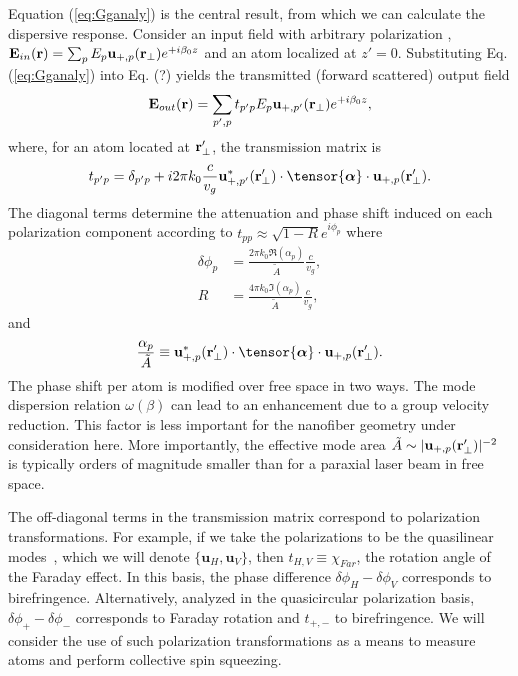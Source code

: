\documentclass[preprint,aps,pra,onecolumn]{revtex4-1} %
\begin{document}
Equation (\ref{eq:Gganaly}) is the central result, from which we can calculate the dispersive response.  
Consider an input field with arbitrary polarization , $\mathbf{E}_{in}(\mathbf{r}) = \sum_p E_p 
\mathbf{u}_{+,p}(\mathbf{r}_\perp) e^{+i \beta_0 z}$ and an atom localized at $z'=0$.  Substituting Eq. 
(\ref{eq:Gganaly}) into Eq. (?) yields the transmitted (forward scattered) output field 
\begin{equation}
\mathbf{E}_{out}(\mathbf{r}) =  \sum_{p',p} t_{p'p} E_p \mathbf{u}_{+, p'}(\mathbf{r}_\perp) e^{+i \beta_0 z}, 
\end{equation}
where, for an atom located at $\mathbf{r}'_\perp$, the transmission matrix is
\begin{equation}
t_{p' p} = \delta_{p' p} + i 2\pi k_0 \frac{c}{v_g}\mathbf{u}^*_{+, p'}(\br'_\perp) \cdot 
\tensor{\boldsymbol{\alpha}} \cdot \mathbf{u}_{+, p}(\br'_\perp) .
\end{equation}
The diagonal terms determine the attenuation and phase shift induced on each polarization component 
according to $t_{p p} \approx \sqrt{1-R}e^{i \phi_p}$ where
\begin{align}
\delta \phi_p &= \frac{2 \pi k_0 \Re(\alpha_p) }{\tilde{A}} \frac{c}{v_g}, \\
R &=  \frac{4 \pi k_0 \Im(\alpha_p) }{\tilde{A}} \frac{c}{v_g},
\label{phaseshift} 
\end{align}
and 
\begin{equation}
 \frac{\alpha_p}{\tilde{A}} \equiv \mathbf{u}^*_{+,p}(\br'_\perp) \cdot \tensor{\boldsymbol{\alpha}}\cdot 
 \mathbf{u}_{+, p}(\br'_\perp). 
 \end{equation}
 The phase shift per atom is modified over free space in two ways.  The mode dispersion relation 
 $\omega(\beta)$ can lead to an enhancement due to a group velocity reduction. This factor is less 
 important for the nanofiber geometry under consideration here.  More importantly, the effective mode 
 area $\tilde{A} \sim |\mathbf{u}_{+,p}(\mathbf{r}'_\perp)|^{-2}$ is typically orders of magnitude smaller than 
 for a paraxial laser beam in free space.  
 
 The off-diagonal terms in the transmission matrix correspond to polarization transformations.  For 
 example, if we take the polarizations to be the quasilinear modes~\cite{?}, which we will denote $\{ 
 \mathbf{u}_{H}, \mathbf{u}_{V}\}$, then $t_{H,V} \equiv \chi_{Far}$,  the rotation angle of the Faraday 
 effect.  In this basis, the phase difference $\delta  \phi_H - \delta \phi_V$ corresponds to birefringence.  
 Alternatively, analyzed in the quasicircular polarization basis, $\delta \phi_+ -\delta  \phi_-$ corresponds 
 to Faraday rotation and $t_{+,-}$ to birefringence.  We will consider the use of such polarization 
 transformations as a means to measure atoms and perform collective spin squeezing.
\end{document}
